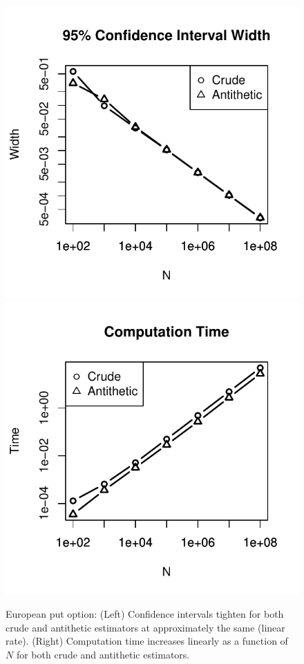 \documentclass[12pt]{article}
\begin{document}
\begin{figure}[H]
	\centering
 	\includegraphics[scale=0.75]{../plots/q1/call_CI_widths.pdf}
	\includegraphics[scale=0.75]{../plots/q1/call_time.pdf}
\caption{European put option: (Left) Confidence intervals tighten for both crude and antithetic estimators at approximately the same (linear rate). (Right) Computation time increases linearly as a function of $N$ for both crude and antithetic estimators.}
\label{fig:call_CI_time}
\end{figure}
\end{document}
